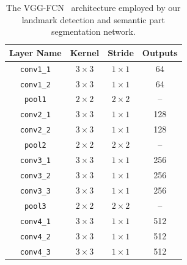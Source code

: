 \begin{table}
  \caption{The
    VGG-FCN~\cite{simonyan2014very,long2015fully}
    architecture employed by our landmark detection and semantic
    part segmentation network.}
\label{tab:archlist}
\centering
\begin{tabular}{|c|c|c|c|}
\hline
Layer Name           & Kernel       & Stride       &  Outputs  \\
\hline\hline
\texttt{conv1\_1}    & $3 \times 3$ & $1 \times 1$ &  64  \\
\texttt{conv1\_2}    & $3 \times 3$ & $1 \times 1$ &  64  \\
\texttt{pool1}       & $2 \times 2$ & $2 \times 2$ &  --  \\
\texttt{conv2\_1}    & $3 \times 3$ & $1 \times 1$ &  128 \\
\texttt{conv2\_2}    & $3 \times 3$ & $1 \times 1$ &  128 \\
\texttt{pool2}       & $2 \times 2$ & $2 \times 2$ &  --  \\
\texttt{conv3\_1}    & $3 \times 3$ & $1 \times 1$ &  256 \\
\texttt{conv3\_2}    & $3 \times 3$ & $1 \times 1$ &  256 \\
\texttt{conv3\_3}    & $3 \times 3$ & $1 \times 1$ &  256 \\
\texttt{pool3}       & $2 \times 2$ & $2 \times 2$ &  --  \\
\texttt{conv4\_1}    & $3 \times 3$ & $1 \times 1$ & 512  \\
\texttt{conv4\_2}    & $3 \times 3$ & $1 \times 1$ & 512  \\
\texttt{conv4\_3}    & $3 \times 3$ & $1 \times 1$ & 512  \\


\end{tabular}
\end{table}
